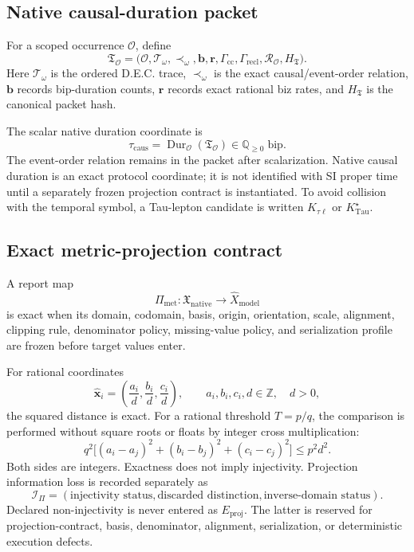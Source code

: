\subsection{Native causal-duration packet}

For a scoped occurrence $\mathcal O$, define
\[
\mathfrak T_{\mathcal O}
=
\bigl(
\mathcal O,
\mathcal T_{\omega},
\prec_{\omega},
\mathbf b,
\mathbf r,
\Gamma_{\mathrm{cc}},
\Gamma_{\mathrm{recl}},
\mathcal R_{\mathcal O},
H_{\mathfrak T}
\bigr).
\]
Here $\mathcal T_{\omega}$ is the ordered D.E.C. trace, $\prec_{\omega}$ is the exact causal/event-order relation, $\mathbf b$ records bip-duration counts, $\mathbf r$ records exact rational biz rates, and $H_{\mathfrak T}$ is the canonical packet hash.

The scalar native duration coordinate is
\[
\tau_{\mathrm{caus}}
=
\operatorname{Dur}_{\mathcal O}(\mathfrak T_{\mathcal O})
\in\mathbb Q_{\ge0}\;\mathrm{bip}.
\]
The event-order relation remains in the packet after scalarization.  Native causal duration is an exact protocol coordinate; it is not identified with SI proper time until a separately frozen projection contract is instantiated.
To avoid collision with the temporal symbol, a Tau-lepton candidate is written $K_{\tau\ell}$ or $K^{\star}_{\mathrm{Tau}}$.

\subsection{Exact metric-projection contract}

A report map
\[
\Pi_{\mathrm{met}}:\mathfrak X_{\mathrm{native}}\longrightarrow\widehat X_{\mathrm{model}}
\]
is exact when its domain, codomain, basis, origin, orientation, scale, alignment, clipping rule, denominator policy, missing-value policy, and serialization profile are frozen before target values enter.

For rational coordinates
\[
\widehat{\mathbf x}_i
=
\left(\frac{a_i}{d},\frac{b_i}{d},\frac{c_i}{d}\right),
\qquad a_i,b_i,c_i,d\in\mathbb Z,\quad d>0,
\]
the squared distance is exact.  For a rational threshold $T=p/q$, the comparison is performed without square roots or floats by integer cross multiplication:
\[
q^2\bigl[(a_i-a_j)^2+(b_i-b_j)^2+(c_i-c_j)^2\bigr]\le p^2d^2.
\]
Both sides are integers.  Exactness does not imply injectivity.  Projection information loss is recorded separately as
\[
\mathcal I_{\Pi}
=
(\text{injectivity status},\text{discarded distinction},\text{inverse-domain status}).
\]
Declared non-injectivity is never entered as $E_{\mathrm{proj}}$.  The latter is reserved for projection-contract, basis, denominator, alignment, serialization, or deterministic execution defects.

